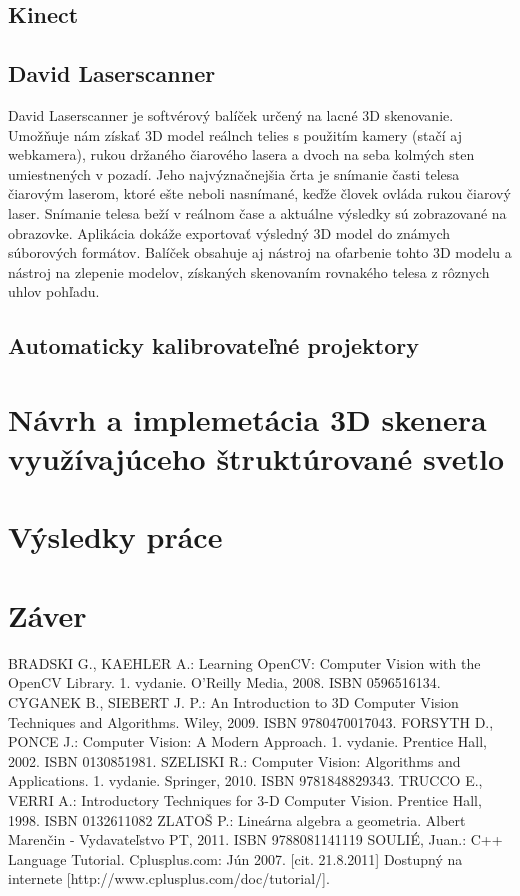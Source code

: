 \documentclass[thesismargins, thesislinespacing, twoside, upjsfrontpage]{rnthesis}
\begin{document}
\section{Kinect}
\section{David Laserscanner}
David Laserscanner je softvérový balíček určený na lacné 3D skenovanie. Umožňuje nám získať 3D model reálnch telies s použitím kamery (stačí aj webkamera), rukou držaného čiarového lasera a dvoch na seba kolmých sten umiestnených v pozadí. Jeho najvýznačnejšia črta je snímanie časti telesa čiarovým laserom, ktoré ešte neboli nasnímané, keďže človek ovláda rukou čiarový laser. Snímanie telesa beží v reálnom čase a aktuálne výsledky sú zobrazované na obrazovke. Aplikácia dokáže exportovať výsledný 3D model do známych súborových formátov. Balíček obsahuje aj nástroj na ofarbenie tohto 3D modelu a nástroj na zlepenie modelov, získaných skenovaním rovnakého telesa z rôznych uhlov pohľadu.
\section{Automaticky kalibrovateľné projektory}


\chapter{Návrh a implemetácia 3D skenera využívajúceho štruktúrované svetlo}

\chapter{Výsledky práce}

\chapter{Záver}

\begin{thebibliography}{1}
BRADSKI G., KAEHLER A.: Learning OpenCV: Computer Vision with the OpenCV Library. 1. vydanie. O'Reilly Media, 2008. ISBN 0596516134.
CYGANEK B., SIEBERT J. P.: An Introduction to 3D Computer Vision Techniques and Algorithms. Wiley, 2009. ISBN 9780470017043.
FORSYTH D., PONCE J.: Computer Vision: A Modern Approach. 1. vydanie. Prentice Hall, 2002. ISBN 0130851981.
SZELISKI R.: Computer Vision: Algorithms and Applications. 1. vydanie. Springer, 2010. ISBN 9781848829343.
TRUCCO E., VERRI A.: Introductory Techniques for 3-D Computer Vision. Prentice Hall, 1998. ISBN 0132611082
ZLATOŠ P.: Lineárna algebra a geometria.  Albert Marenčin - Vydavateľstvo PT, 2011. ISBN 9788081141119
SOULIÉ, Juan.: C++ Language Tutorial. Cplusplus.com: Jún 2007. [cit. 21.8.2011] Dostupný na internete [http://www.cplusplus.com/doc/tutorial/].

\end{thebibliography}
\end{document}
